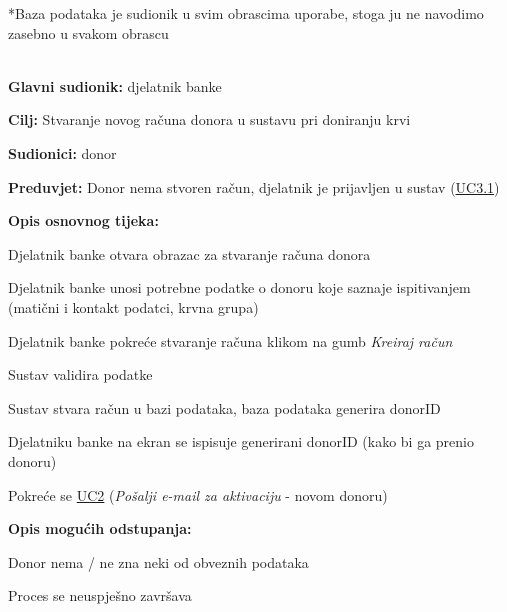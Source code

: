                 \par {
                    *Baza podataka je sudionik u svim obrascima uporabe, stoga ju ne navodimo zasebno u svakom obrascu
                } \\ \\
					\noindent {} \label{UC1.1}
					\begin{packed_item}
	
						\item \textbf{Glavni sudionik: }djelatnik banke
						\item  \textbf{Cilj:} Stvaranje novog računa donora u sustavu pri doniranju krvi
						\item  \textbf{Sudionici:} donor
						\item  \textbf{Preduvjet:} Donor nema stvoren račun, djelatnik je prijavljen u sustav (\hyperref[UC3.1]{UC3.1})
						\item  \textbf{Opis osnovnog tijeka:}
						
						\item[] \begin{packed_enum}
							\item Djelatnik banke otvara obrazac za stvaranje računa donora
							\item Djelatnik banke unosi potrebne podatke o donoru koje saznaje ispitivanjem (matični i kontakt podatci, krvna grupa)
							\item Djelatnik banke pokreće stvaranje računa klikom na gumb \textit{Kreiraj račun}
							\item Sustav validira podatke 
							\item Sustav stvara račun u bazi podataka, baza podataka generira donorID
							\item Djelatniku banke na ekran se ispisuje generirani donorID (kako bi ga prenio donoru)
							\item Pokreće se \hyperref[UC2]{UC2} (\textit{Pošalji e-mail za aktivaciju} - novom donoru)
						\end{packed_enum}
						
						\item  \textbf{Opis mogućih odstupanja:}
						
						\item[] \begin{packed_item}
	
							\item[2.a] Donor nema / ne zna neki od obveznih podataka
							\begin{packed_enum}
								\item Proces se neuspješno završava
							\end{packed_enum}
							

\end{packed_item}
\end{packed_item}
